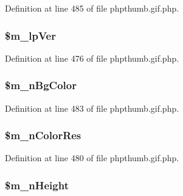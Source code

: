 \-Definition at line 485 of file phpthumb.\-gif.\-php.

\hypertarget{class_c_g_i_f_f_i_l_e_h_e_a_d_e_r_a026531f676e806e1381a8c0532b084bf}{
\subsubsection[{\$m\-\_\-lp\-Ver}]{\setlength{\rightskip}{0pt plus 5cm}\$m\-\_\-lp\-Ver}}\label{class_c_g_i_f_f_i_l_e_h_e_a_d_e_r_a026531f676e806e1381a8c0532b084bf}


\-Definition at line 476 of file phpthumb.\-gif.\-php.

\hypertarget{class_c_g_i_f_f_i_l_e_h_e_a_d_e_r_a7d0d3e2e7726635f1e86b314008677a7}{
\subsubsection[{\$m\-\_\-n\-Bg\-Color}]{\setlength{\rightskip}{0pt plus 5cm}\$m\-\_\-n\-Bg\-Color}}\label{class_c_g_i_f_f_i_l_e_h_e_a_d_e_r_a7d0d3e2e7726635f1e86b314008677a7}


\-Definition at line 483 of file phpthumb.\-gif.\-php.

\hypertarget{class_c_g_i_f_f_i_l_e_h_e_a_d_e_r_a9c00391316e2b9105cea37d5175330ac}{
\subsubsection[{\$m\-\_\-n\-Color\-Res}]{\setlength{\rightskip}{0pt plus 5cm}\$m\-\_\-n\-Color\-Res}}\label{class_c_g_i_f_f_i_l_e_h_e_a_d_e_r_a9c00391316e2b9105cea37d5175330ac}


\-Definition at line 480 of file phpthumb.\-gif.\-php.

\hypertarget{class_c_g_i_f_f_i_l_e_h_e_a_d_e_r_ab3bbe2d26a618a3b92da277e120b9ebc}{
\subsubsection[{\$m\-\_\-n\-Height}]{\setlength{\rightskip}{0pt plus 5cm}\$m\-\_\-n\-Height}}\label{class_c_g_i_f_f_i_l_e_h_e_a_d_e_r_ab3bbe2d26a618a3b92da277e120b9ebc}


